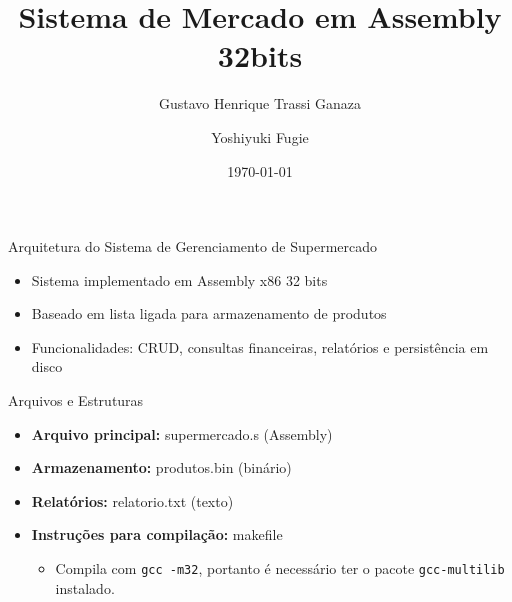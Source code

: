 \documentclass{beamer}
\title{Sistema de Mercado em Assembly 32bits}
\author{Gustavo Henrique Trassi Ganaza \and Yoshiyuki Fugie}
\date{\today}
\begin{document}
\begin{frame}
    \titlepage
\end{frame}

\begin{frame}{Arquitetura do Sistema de Gerenciamento de Supermercado}
    \begin{itemize}
        \item Sistema implementado em Assembly x86 32 bits
        \item Baseado em lista ligada para armazenamento de produtos
        \item Funcionalidades: CRUD, consultas financeiras, relatórios e persistência em disco
    \end{itemize}
\end{frame}

\begin{frame}{Arquivos e Estruturas}
    \begin{itemize}
        \item \textbf{Arquivo principal:} supermercado.s (Assembly)
        \item \textbf{Armazenamento:} produtos.bin (binário)
        \item \textbf{Relatórios:} relatorio.txt (texto)
        \item \textbf{Instruções para compilação:} makefile
        \begin{itemize}
            \item Compila com \texttt{gcc -m32}, portanto é necessário ter o pacote  \texttt{gcc-multilib} instalado.
        \end{itemize}
    \end{itemize}
\end{frame}
\end{document}
